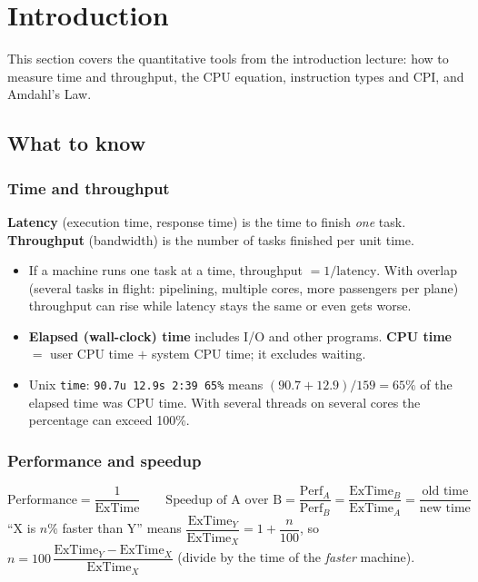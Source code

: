 \section{Introduction}
\label{sec:intro}

This section covers the quantitative tools from the introduction lecture: how to
measure time and throughput, the CPU equation, instruction types and CPI, and
Amdahl's Law.

\subsection{What to know}

\subsubsection{Time and throughput}
\begin{definition}
\textbf{Latency} (execution time, response time) is the time to finish
\emph{one} task. \textbf{Throughput} (bandwidth) is the number of tasks
finished per unit time.
\end{definition}
\begin{itemize}[leftmargin=*]
  \item If a machine runs one task at a time, throughput $=1/\text{latency}$.
  With overlap (several tasks in flight: pipelining, multiple cores, more
  passengers per plane) throughput can rise while latency stays the same or
  even gets worse.
  \item \textbf{Elapsed (wall-clock) time} includes I/O and other programs.
  \textbf{CPU time} $=$ user CPU time $+$ system CPU time; it excludes waiting.
  \item Unix \texttt{time}: \texttt{90.7u 12.9s 2:39 65\%} means
  $(90.7+12.9)/159=65\%$ of the elapsed time was CPU time. With several
  threads on several cores the percentage can exceed 100\%.
\end{itemize}

\subsubsection{Performance and speedup}
\[
  \text{Performance}=\frac{1}{\text{ExTime}}\qquad
  \text{Speedup of A over B}=\frac{\text{Perf}_A}{\text{Perf}_B}
  =\frac{\text{ExTime}_B}{\text{ExTime}_A}=\frac{\text{old time}}{\text{new time}}
\]
``X is $n\%$ faster than Y'' means
$\dfrac{\text{ExTime}_Y}{\text{ExTime}_X}=1+\dfrac{n}{100}$, so
$n=100\,\dfrac{\text{ExTime}_Y-\text{ExTime}_X}{\text{ExTime}_X}$ (divide by
the time of the \emph{faster} machine).

